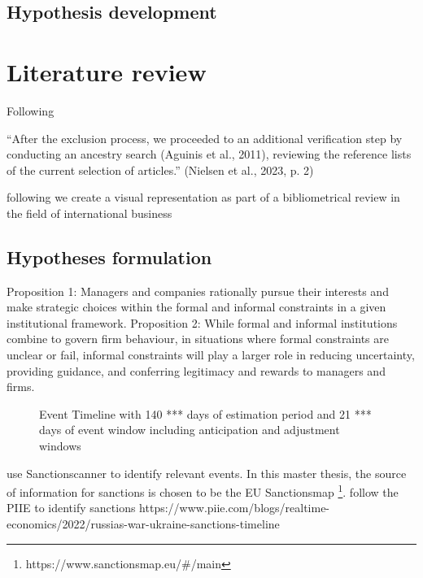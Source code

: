 \documentclass[12pt,a4paper]{article}
\begin{document}
\subsection{Hypothesis development}

\section{Literature review}
Following \citep{hiebl_sample_2023}

“After the exclusion process, we proceeded to an additional verification step by conducting an ancestry search (Aguinis et al., 2011), reviewing the reference lists of the current selection of articles.” (Nielsen et al., 2023, p. 2) \citep{nielsen_disasters_2023}

following \citep{paul_art_2020} we create a visual representation as part of a bibliometrical review in the field of international business

\subsection{Hypotheses formulation}

\cite{aria_bibliometrix_nodate}

Proposition 1: Managers and companies rationally pursue their interests and make strategic choices within the formal and informal constraints in a given institutional
framework.
Proposition 2:  While formal and informal institutions combine to govern firm behaviour, in situations where formal constraints are unclear or fail, informal constraints will play a larger role in reducing uncertainty, providing guidance, and conferring legitimacy and rewards to managers and firms.

\begin{figure}[ht]
  \centering
  
  \caption{Event Timeline with 140 *** days of estimation period and 21 *** days of event window including anticipation and adjustment windows}
  \label{es_graph}
\end{figure}

\cite[p.~19]{kiesel_should_2023} use Sanctionscanner to identify relevant events. In this master thesis, the source of information for sanctions is chosen to be the EU Sanctionsmap \footnote{https://www.sanctionsmap.eu/#/main}.  
\citep[p.~3]{kumari_are_2023} follow the PIIE to identify sanctions https://www.piie.com/blogs/realtime-economics/2022/russias-war-ukraine-sanctions-timeline
\end{document}
